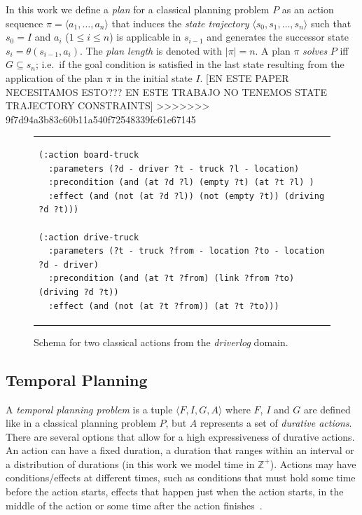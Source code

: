 \documentclass[runningheads]{llncs}
\newcommand{\tup}[1]{{\langle #1 \rangle}}
\begin{document}
In this work we define a {\em plan} for a classical planning problem $P$ as an action sequence $\pi=\tup{a_1, \ldots, a_n}$ that induces the {\em state trajectory} $\tup{s_0, s_1, \ldots, s_n}$ such that $s_0=I$ and $a_i$ ({\small $1\leq i\leq n$}) is applicable in $s_{i-1}$ and generates the successor state $s_i=\theta(s_{i-1},a_i)$. The {\em plan length} is denoted with $|\pi|=n$. A plan $\pi$ {\em solves} $P$ iff $G\subseteq s_n$; i.e.~if the goal condition is satisfied in the last state resulting from the application of the plan $\pi$ in the initial state $I$. [EN ESTE PAPER NECESITAMOS ESTO??? EN ESTE TRABAJO NO TENEMOS STATE TRAJECTORY CONSTRAINTS]
>>>>>>> 9f7d94a3b83c60b11a540f72548339fc61e67145


\begin{figure}
\begin{tabular}{p{\textwidth}}
\begin{verbatim}
(:action board-truck
  :parameters (?d - driver ?t - truck ?l - location)
  :precondition (and (at ?d ?l) (empty ?t) (at ?t ?l) )
  :effect (and (not (at ?d ?l)) (not (empty ?t)) (driving ?d ?t)))

(:action drive-truck
  :parameters (?t - truck ?from - location ?to - location ?d - driver)
  :precondition (and (at ?t ?from) (link ?from ?to) (driving ?d ?t))
  :effect (and (not (at ?t ?from)) (at ?t ?to)))
\end{verbatim}
\end{tabular}
\label{fig:exampleactions1}
\caption{\small Schema for two classical actions from the {\em driverlog} domain.}
\end{figure}



\subsection{Temporal Planning}
\label{sec:temporalplanning}

A {\em temporal planning problem} is a tuple $\tup{F,I,G,A}$ where $F$, $I$ and $G$ are defined like in a classical planning problem $P$, but $A$ represents a set of {\em durative actions}. There are several options that allow for a high expressiveness of durative actions. An action can have a fixed duration, a duration that ranges within an interval or a distribution of durations (in this work we model time in $\mathbb{Z}^+$). Actions may have conditions/effects at different times, such as conditions that must hold some time before the action starts, effects that happen just when the action starts, in the middle of the action or some time after the action finishes~\cite{garrido2009constraint}.
\end{document}
